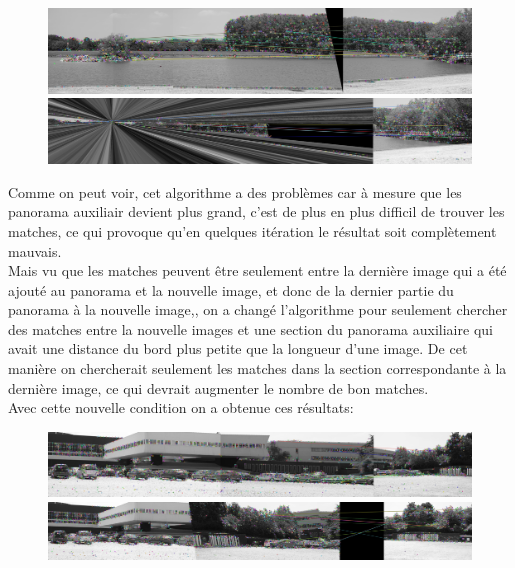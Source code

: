 \documentclass[11pt]{article}
\begin{document}
\begin{figure}[H]
\centering
\includegraphics[width=.8\textwidth]{../resources/output/iterative_panorama2.jpg}
\includegraphics[width=.8\textwidth]{../resources/output/iterative_panorama3.jpg}
\end{figure}

Comme on peut voir, cet algorithme a des problèmes car à mesure que les panorama auxiliair devient plus grand, c’est de plus en plus difficil de trouver les matches, ce qui provoque qu’en quelques itération le résultat soit complètement mauvais. \\
Mais vu que les matches peuvent être seulement entre la dernière image qui a été ajouté au panorama et la nouvelle image, et donc de la dernier partie du panorama à la nouvelle image,, on a changé l’algorithme pour seulement chercher des matches entre la nouvelle images et une section du panorama auxiliaire qui avait une distance du bord plus petite que la longueur d’une image. De cet manière on chercherait seulement les matches dans la section correspondante à la dernière image, ce qui devrait augmenter le nombre de bon matches.\\
Avec cette nouvelle condition on a obtenue ces résultats: 

\begin{figure}[H]
\centering
\includegraphics[width=.8\textwidth]{../resources/output/iterative_panorama_filtered3.jpg}
\includegraphics[width=.8\textwidth]{../resources/output/iterative_panorama_filtered4.jpg}
\end{figure}
\end{document}
